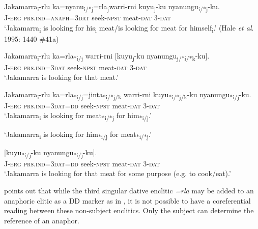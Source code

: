 \documentclass[output=paper]{../langscibook}
\begin{document}
\ea%
    \label{ex:laughren:13}
\ea
\label{ex:laughren:13a}
\gll Jakamarra\textsubscript{i}-rlu  ka=nyanu\textsubscript{i/*j}=rla\textsubscript{j}warri-rni  kuyu\textsubscript{j}-ku  nyanungu\textsubscript{i/*j}-ku.\\
    J-\textsc{erg}  \textsc{prs.ind}\textsc{=anaph=3dat}  seek-\textsc{npst} meat-\textsc{dat}  3-\textsc{dat}\\
\glt `Jakamarra\textsubscript{i} is looking for his\textsubscript{i} meat/is looking for meat for himself\textsubscript{i}.' (Hale \textit{et al}. 1995: 1440 \#41a)

\ex
\label{ex:laughren:13b}
\gll Jakamarra\textsubscript{i}-rlu  ka=rla\textsubscript{*i/j} {warri-rni} [{kuyu\textsubscript{j}}-ku  nyanungu{\textsubscript{j/*i/*k}}{{}-ku}].\\
    J-\textsc{erg}  \textsc{prs.ind}\textsc{=3dat}  seek-\textsc{npst}  meat-\textsc{dat}  3-\textsc{dat}\\
\glt `Jakamarra is looking for that meat.'

\ex
\label{ex:laughren:13c}
\gll Jakamarra\textsubscript{i}-rlu ka=rla\textsubscript{*i/j}=jinta\textsubscript{*i/*j/k} warri-rni  kuyu\textsubscript{*i/*j/k}-ku  nyanungu\textsubscript{*i/j}-ku.\\
J-\textsc{erg} \textsc{prs.ind=3dat=dd} seek-\textsc{npst} meat-\textsc{dat} 3-\textsc{dat}\\

\glt `Jakamarra\textsubscript{i} is looking for meat\textsubscript{*i/*j} for him\textsubscript{*i/j}.'

\glt `Jakamarra\textsubscript{i} is looking for him\textsubscript{*i/j} for meat\textsubscript{*i/*j}.'

\ex
\label{ex:laughren:13d}
 [{kuyu\textsubscript{*i/j}}{{}-ku  nyanungu}{\textsubscript{*i/j}}{{}-ku}].\\
    J-\textsc{erg}  \textsc{prs.ind=3dat=dd}  seek-\textsc{npst}  meat-\textsc{dat}  3-\textsc{dat}\\
  \glt `Jakamarra is looking for that meat for some purpose (e.g. to cook/eat).'
\z
\z


\citet[167]{Simpson1991} points out that while the third singular dative enclitic  \textit{=rla} may be added to an anaphoric clitic as a DD marker as in , it is not possible to have a coreferential reading between these non-subject enclitics. Only the subject can determine the reference of an anaphor.
\end{document}
